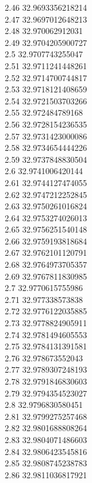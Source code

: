 {2.46	32.9693356218214\\
2.47	32.9697012648213\\
2.48	32.970062912031\\
2.49	32.9704205900727\\
2.5	32.9707743255047\\
2.51	32.9711241448261\\
2.52	32.9714700744817\\
2.53	32.9718121408659\\
2.54	32.9721503703266\\
2.55	32.972484789168\\
2.56	32.9728154236535\\
2.57	32.9731423000086\\
2.58	32.9734654444226\\
2.59	32.9737848830504\\
2.6	32.9741006420144\\
2.61	32.9744127474055\\
2.62	32.9747212252845\\
2.63	32.9750261016824\\
2.64	32.9753274026013\\
2.65	32.9756251540148\\
2.66	32.9759193818684\\
2.67	32.9762101120791\\
2.68	32.9764973705357\\
2.69	32.9767811830985\\
2.7	32.9770615755986\\
2.71	32.977338573838\\
2.72	32.9776122035885\\
2.73	32.9778824905911\\
2.74	32.9781494605553\\
2.75	32.9784131391581\\
2.76	32.978673552043\\
2.77	32.9789307248193\\
2.78	32.9791846830603\\
2.79	32.9794354523027\\
2.8	32.9796830580451\\
2.81	32.9799275257468\\
2.82	32.9801688808264\\
2.83	32.9804071486603\\
2.84	32.9806423545816\\
2.85	32.9808745238783\\
2.86	32.9811036817921\\
}
